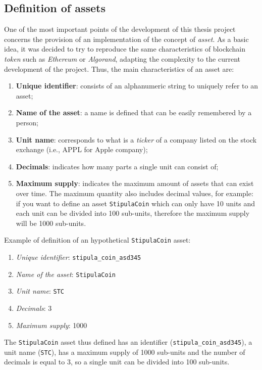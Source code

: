 \subsection{Definition of assets}
\label{asset-definition}

One of the most important points of the development of this thesis project concerns the provision of an 
implementation of the concept of \textit{asset}. As a basic idea, it was decided to try to reproduce the 
same characteristics of blockchain \textit{token} such as \textit{Ethereum} or \textit{Algorand}, adapting 
the complexity to the current development of the project. Thus, the main characteristics of an asset are:
\begin{enumerate}
	\item \textbf{Unique identifier}: consists of an alphanumeric string to uniquely refer to an asset;
	\item \textbf{Name of the asset}: a name is defined that can be easily remembered by a person;
	\item \textbf{Unit name}: corresponds to what is a \textit{ticker} of a company listed on the stock 
	exchange (i.e., APPL for Apple company);
	\item \textbf{Decimals}: indicates how many parts a single unit can consist of;
	\item \textbf{Maximum supply}: indicates the maximum amount of assets that can exist over time. The 
	maximum quantity also includes decimal values, for example: if you want to define an asset 
	\verb|StipulaCoin| which can only have 10 units and each unit can be divided into 100 sub-units, therefore 
	the maximum supply will be 1000 sub-units.
\end{enumerate}
Example of definition of an hypothetical \verb|StipulaCoin| asset:
\label{definition-fungible-asset}
\begin{enumerate}
	\item \textit{Unique identifier}: \verb|stipula_coin_asd345|
	\item \textit{Name of the asset}: \verb|StipulaCoin|
	\item \textit{Unit name}: \verb|STC|
	\item \textit{Decimals}: 3
	\item \textit{Maximum supply}: 1000
\end{enumerate}
The \verb|StipulaCoin| asset thus defined has an identifier (\verb|stipula_coin_asd345|), a unit name 
(\verb|STC|), has a maximum supply of 1000 sub-units and the number of decimals is equal to 3, so a single 
unit can be divided into 100 sub-units.

